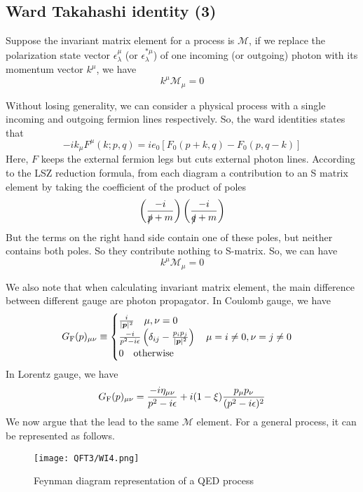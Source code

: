\subsection{Ward Takahashi identity (3)}
Suppose the invariant matrix element for a process is $\mathcal{M}$, if we replace the polarization state vector $\epsilon_{\lambda}^{\mu}$ (or $\epsilon_{\lambda}^{*\mu}$) of one incoming (or outgoing) photon with its momentum vector $k^{\mu}$, we have
\[k^{\mu} \mathcal{M}_{\mu} = 0\]
\begin{newproof}
Without losing generality, we can consider a physical process with a single incoming and outgoing fermion lines respectively. So, the ward identities states that
\[-ik_{\mu} F^{\mu}(k;p,q) = ie_0\left[F_0(p+k,q)-F_0(p,q-k)\right]\]
Here, $F$ keeps the external fermion legs but cuts external photon lines. According to the LSZ reduction formula, from each diagram a contribution to an S matrix element by taking the coefficient of the product of poles
\[\left( \frac{-i}{\slashed{p}+m} \right) \left( \frac{-i}{\slashed{q}+m} \right)\] 
But the terms on the right hand side contain one of these poles, but neither contains both poles. So they contribute nothing to S-matrix. 
So, we can have
\[k^{\mu} \mathcal{M}_{\mu} = 0\] 
\end{newproof}

\noindent
We also note that when calculating invariant matrix element, the main difference between different gauge are photon propagator. In Coulomb gauge, we have
\[G_{\rm F}(p)_{\mu\nu} \equiv \begin{cases} \frac{i}{|\bm{p}|^2} \quad \mu,\nu=0\\  \frac{-i}{p^2-i\epsilon} \left(\delta_{ij} - \frac{p_ip_j}{|\bm{p}|^2}\right) \quad \mu = i \neq 0, \nu = j \neq 0 \\ 0 \quad \mbox{otherwise} \end{cases} \]
In Lorentz gauge, we have
\[G_{\rm F}(p)_{\mu\nu}  = \frac{-i\eta_{\mu\nu}}{p^2-i\epsilon} + i(1-\xi)\frac{p_{\mu}p_{\nu}}{(p^2-i\epsilon)^2} \]
We now argue that the lead to the same $\mathcal{M}$ element.
For a general process, it can be represented as follows.

\begin{figure}[!h]
\centering
\texttt{[image: QFT3/WI4.png]}
\caption{Feynman diagram representation of a QED process}
\end{figure}

